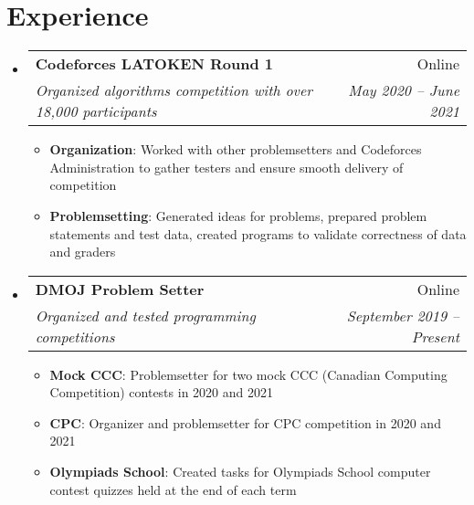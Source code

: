 \documentclass[letterpaper,11pt]{article}
\makeatletter
\newcommand{\resumeItem}[2]{
  \item\small{
    \textbf{#1}{: #2 \vspace{-2pt}}
  }
}
\newcommand{\resumeSubheading}[4]{
  \vspace{-1pt}\item
    \begin{tabular*}{0.97\textwidth}[t]{l@{\extracolsep{\fill}}r}
      \textbf{#1} & #2 \\
      \textit{\small#3} & \textit{\small #4} \\
    \end{tabular*}\vspace{-5pt}
}
\newcommand{\resumeSubHeadingListStart}{\begin{itemize}[leftmargin=*]}
\newcommand{\resumeSubHeadingListEnd}{\end{itemize}}
\newcommand{\resumeItemListStart}{\begin{itemize}}
\newcommand{\resumeItemListEnd}{\end{itemize}\vspace{-5pt}}
\makeatother
\begin{document}
\section{Experience}
  \resumeSubHeadingListStart
    \resumeSubheading
      {Codeforces LATOKEN Round 1}{Online}
      {Organized algorithms competition with over 18,000 participants}{May 2020 -- June 2021}
      \resumeItemListStart
        \resumeItem{Organization}
          {Worked with other problemsetters and Codeforces Administration to gather testers and ensure smooth delivery of competition}
        \resumeItem{Problemsetting}
          {Generated ideas for problems, prepared problem statements and test data, created programs to validate correctness of data and graders}
      \resumeItemListEnd
    
    \resumeSubheading
      {DMOJ Problem Setter}{Online}
      {Organized and tested programming competitions}{September 2019 -- Present}
      \resumeItemListStart
        \resumeItem{Mock CCC}
          {Problemsetter for two mock CCC (Canadian Computing Competition) contests in 2020 and 2021}
        \resumeItem{CPC}
          {Organizer and problemsetter for CPC competition in 2020 and 2021}
        \resumeItem{Olympiads School}
          {Created tasks for Olympiads School computer contest quizzes held at the end of each term}
      \resumeItemListEnd
    

  \resumeSubHeadingListEnd

\end{document}
